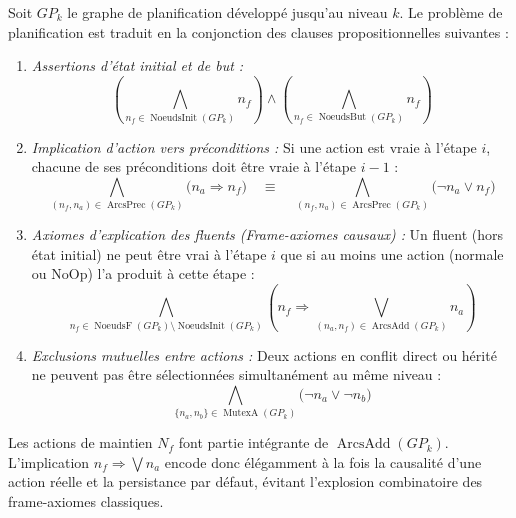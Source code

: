 \begin{definition}
    Soit $GP_k$ le graphe de planification développé jusqu'au niveau $k$. Le problème de planification est traduit en la conjonction des clauses propositionnelles suivantes :
    \begin{enumerate}
        \item \emph{Assertions d'état initial et de but :}
        \begin{equation}
            \left( \bigwedge_{n_f \in \operatorname{NoeudsInit}(GP_k)} n_f \right) \land \left( \bigwedge_{n_f \in \operatorname{NoeudsBut}(GP_k)} n_f \right)
        \end{equation}
        \item \emph{Implication d'action vers préconditions :} Si une action est vraie à l'étape $i$, chacune de ses préconditions doit être vraie à l'étape $i-1$ :
        \begin{equation}
            \bigwedge_{(n_f, n_a) \in \operatorname{ArcsPrec}(GP_k)} \big( n_a \Longrightarrow n_f \big) \quad \equiv \quad \bigwedge_{(n_f, n_a) \in \operatorname{ArcsPrec}(GP_k)} \big( \neg n_a \lor n_f \big)
        \end{equation}
        \item \emph{Axiomes d'explication des fluents (Frame-axiomes causaux) :} Un fluent (hors état initial) ne peut être vrai à l'étape $i$ que si au moins une action (normale ou NoOp) l'a produit à cette étape :
        \begin{equation}
            \bigwedge_{n_f \in \operatorname{NoeudsF}(GP_k) \setminus \operatorname{NoeudsInit}(GP_k)} \left( n_f \Longrightarrow \bigvee_{(n_a, n_f) \in \operatorname{ArcsAdd}(GP_k)} n_a \right)
        \end{equation}
        \item \emph{Exclusions mutuelles entre actions :} Deux actions en conflit direct ou hérité ne peuvent pas être sélectionnées simultanément au même niveau :
        \begin{equation}
            \bigwedge_{\{n_a, n_b\} \in \operatorname{MutexA}(GP_k)} \big( \neg n_a \lor \neg n_b \big)
        \end{equation}
    \end{enumerate}
\end{definition}

\begin{remark}
    Les actions de maintien $N_f$ font partie intégrante de $\operatorname{ArcsAdd}(GP_k)$. L'implication $n_f \Longrightarrow \bigvee n_a$ encode donc élégamment à la fois la causalité d'une action réelle et la persistance par défaut, évitant l'explosion combinatoire des frame-axiomes classiques.
\end{remark}

